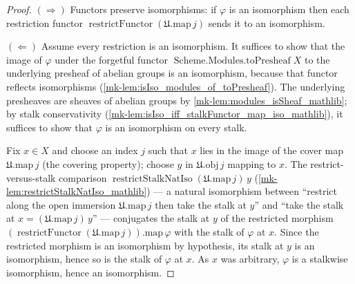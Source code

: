 \begin{proof}
  \((\Rightarrow)\) Functors preserve isomorphisms: if \(\varphi\) is an isomorphism then each
  restriction functor \(\operatorname{restrictFunctor}(\mathfrak{U}.\mathrm{map}\,j)\) sends it to
  an isomorphism.

  \((\Leftarrow)\) Assume every restriction is an isomorphism. It suffices to show that the image
  of \(\varphi\) under the forgetful functor \(\operatorname{Scheme.Modules.toPresheaf} X\) to the
  underlying presheaf of abelian groups is an isomorphism, because that functor reflects
  isomorphisms (\ref{mk-lem:isIso_modules_of_toPresheaf}). The underlying presheaves are
  sheaves of abelian groups by \ref{mk-lem:modules_isSheaf_mathlib}; by stalk
  conservativity (\ref{mk-lem:isIso_iff_stalkFunctor_map_iso_mathlib}), it suffices to
  show that \(\varphi\) is an isomorphism on every stalk.

  Fix \(x \in X\) and choose an index \(j\) such that \(x\) lies in the image of the cover map
  \(\mathfrak{U}.\mathrm{map}\,j\) (the covering property); choose \(y\) in
  \(\mathfrak{U}.\mathrm{obj}\,j\) mapping to \(x\). The restrict-versus-stalk comparison
  \(\operatorname{restrictStalkNatIso}(\mathfrak{U}.\mathrm{map}\,j)\,y\)
  (\ref{mk-lem:restrictStalkNatIso_mathlib}) --- a natural isomorphism between ``restrict along the
  open immersion \(\mathfrak{U}.\mathrm{map}\,j\) then take the stalk at \(y\)'' and ``take the
  stalk at \(x = (\mathfrak{U}.\mathrm{map}\,j)\,y\)'' --- conjugates the stalk at \(y\) of the
  restricted morphism \((\operatorname{restrictFunctor}(\mathfrak{U}.\mathrm{map}\,j)).\mathrm{map}\,\varphi\)
  with the stalk of \(\varphi\) at \(x\). Since the restricted morphism is an
  isomorphism by hypothesis, its stalk at \(y\) is an isomorphism, hence so is the stalk of
  \(\varphi\) at \(x\). As \(x\) was arbitrary, \(\varphi\) is a stalkwise isomorphism, hence an
  isomorphism.
\end{proof}


